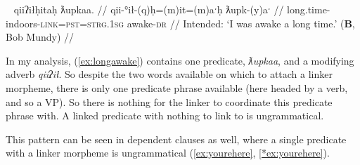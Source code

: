 \ex~ \label{*ex:longawake2}
\begingl
\glpreamble *qiiʔiłḥitaḥ ƛupkaa. //
\gla qii-°ił-(q)ḥ=(m)it=(m)aˑḥ ƛupk-(y)aˑ //
\glb long.time-indoors-\textsc{link}=\textsc{pst}=\textsc{strg.1sg} awake-\textsc{dr} //
\glft Intended: `I was awake a long time.' (\textbf{B}, Bob Mundy) //
\endgl
\xe

\begin{comment}
\ex \label{ex:longawake}
\begingl
\glpreamble qiiʔiłs ƛupkaaqḥ. //
\gla qiiʔił=s ƛupk-(y)aˑ-(q)ḥ //
\glb lie.in.bed.a.long.time=\textsc{strg.1sg} awake-\textsc{dr}-\textsc{link} //
\glft `I lay awake inside for a long time.' (\textbf{N}, \textit{yuułnaak} Simon Lucas) //
\endgl
\xe

\ex~ \label{*ex:longawake}
\begingl
\glpreamble *ƛupkaaqḥs qii. //
\gla ƛupk-(y)aˑ-(q)ḥ=s qii //
\glb awake-\textsc{dr}-\textsc{link}=\textsc{strg.1sg} long.time //
\glft Intended: `I lay awake for a long time.' (\textbf{N}, \textit{yuułnaak} Simon Lucas) //
\endgl
\xe
\end{comment}

In my analysis, (\ref{ex:longawake}) contains one predicate, \textit{ƛupkaa}, and a modifying adverb \textit{qiiʔił}. So despite the two words available on which to attach a linker morpheme, there is only one predicate phrase available (here headed by a verb, and so a VP). So there is nothing for the linker to coordinate this predicate phrase with. A linked predicate with nothing to link to is ungrammatical.


This pattern can be seen in dependent clauses as well, where a single predicate with a linker morpheme is  ungrammatical (\ref{ex:yourehere}, \ref{*ex:yourehere}).

